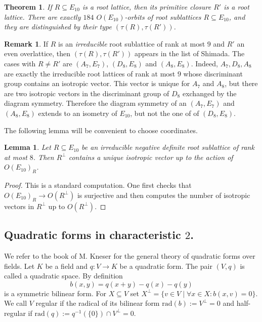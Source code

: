 \documentclass[a4paper]{amsart}
\theoremstyle{definition}
\newtheorem{remark}[definition]{Remark}
\theoremstyle{plain}
\newtheorem{theorem}[definition]{Theorem}
\newtheorem{lemma}[definition]{Lemma}
\begin{document}
\begin{theorem}\cite{shimada:ADE}
If $R\subseteq E_{10}$ is a root lattice, then its primitive closure $R'$ is a root lattice. There are exactly $184$ $O(E_{10})$-orbits of root sublattices $R \subseteq E_{10}$, and they are distinguished by 
their type $(\tau(R),\tau(R'))$.
\end{theorem}
\begin{remark}\label{shimada:irreducible}
If $R$ is an \emph{irreducible} root sublattice of rank at most $9$ and $R'$ an even overlattice, then $(\tau(R),\tau(R'))$ appears in the list of Shimada.
The cases with $R\neq R'$ are $(A_7,E_7)$, $(D_8,E_8)$ and $(A_8,E_8)$. Indeed, $A_7,D_8,A_8$ are exactly the irreducible root lattices of rank at most $9$ whose discriminant group contains an isotropic vector. 
This vector is unique for $A_7$ and $A_8$, but there are two isotropic vectors in the discriminant group of $D_8$ exchanged by the diagram symmetry. Therefore the diagram symmetry of an $(A_7,E_7)$ and $(A_8,E_8)$ extends to an isometry of $E_{10}$, but not the one of of $(D_8,E_8)$.
\end{remark}
The following lemma will be convenient to choose coordinates.
\begin{lemma}\label{lem:isotropic_in_Rperp}
Let $R\subseteq E_{10}$ be an irreducible negative definite root sublattice of rank at most $8$. Then $R^\perp$ contains a unique isotropic vector up to the action of $O(E_{10})_{R}$.
\end{lemma}
\begin{proof}
This is a standard computation. One first checks that $O(E_{10})_{R} \to O(R^\perp)$ is surjective and then computes the number of isotropic vectors in $R^\perp$ up to $O(R^\perp)$.
\end{proof}

\subsection*{Quadratic forms in characteristic $2$.}
We refer to the book of M. Kneser \cite{kneser} for the general theory of quadratic forms over fields.
Let $K$ be a field and $q:V \to K$ be a quadratic form. The pair $(V,q)$ is called a quadratic space. By definition 
\[b(x,y)=q(x+y)-q(x)-q(y)\] 
is a symmetric bilinear form. 
For $X \subseteq V$ set $X^\perp = \{v \in V \mid \forall x \in X\colon b(x,v)=0 \}$.
We call $V$ regular if the radical of its bilinear form $\mathrm{rad}(b):=V^\perp=0$ and half-regular if 
$\mathrm{rad}(q):=q^{-1}(\{0\})\cap V^\perp = 0$.
\end{document}
